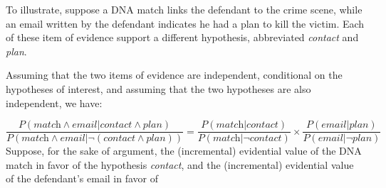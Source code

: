\documentclass[10pt]{article}
\begin{document}
To illustrate, suppose a DNA match links the defendant to the crime scene, while an email written by the defendant indicates 
he had a plan to kill the victim. Each of these item of evidence support a different hypothesis, abbreviated
 \textit{contact} and \textit{plan}.

%
 Assuming that the two items of evidence are independent, conditional on 
 the hypotheses of interest, and assuming that the two hypotheses 
 are also independent, we have:

 \[
 \frac{P(\textit{match} \wedge \textit{email} | \textit{contact}\wedge \textit{plan})}{P(\textit{match} \wedge \textit{email} | \neg (\textit{contact} \wedge \textit{plan}))}  
 = \frac{P(\textit{match} | \textit{contact})}{P(\textit{match} | \neg \textit{contact})}  \times  
 \frac{P( \textit{email} | \textit{plan})}{P(\textit{email} | \neg \textit{plan})} 
 \]
Suppose, for the sake of argument, the (incremental) 
evidential value of the DNA match in favor 
of the hypothesis \textit{contact}, 
and the (incremental) evidential value of the defendant's email in favor of 
\end{document}

